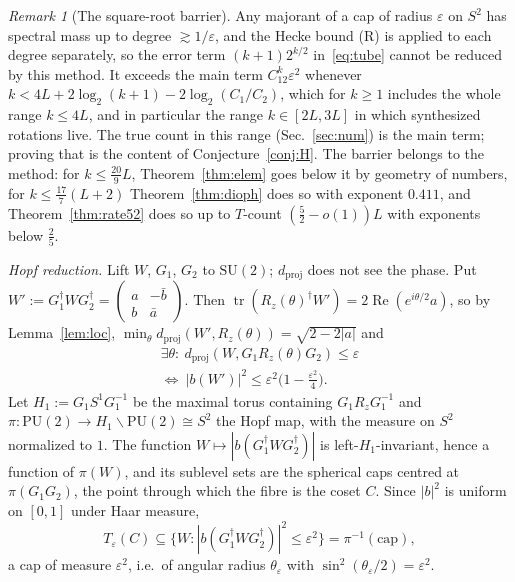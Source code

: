 \documentclass[aps,prx,twocolumn,superscriptaddress,nofootinbib,longbibliography]{revtex4-2}
\theoremstyle{plain}
\theoremstyle{definition}
\theoremstyle{remark}
\newtheorem{remark}{Remark}
\newcommand{\dproj}{d_{\mathrm{proj}}}
\newcommand{\PU}{\mathrm{PU}(2)}
\newcommand{\SU}{\mathrm{SU}(2)}
\newcommand{\tr}{\operatorname{tr}}
\begin{document}
\begin{remark}[The square-root barrier]\label{rem:barrier}
Any majorant of a cap of radius $\varepsilon$ on $S^2$ has spectral mass up to degree $\gtrsim1/\varepsilon$, and the Hecke bound (R) is applied to each degree separately, so the error term $(k+1)2^{k/2}$ in~\eqref{eq:tube} cannot be reduced by this method. It exceeds the main term $C_12^k\varepsilon^2$ whenever $k<4L+2\log_2(k+1)-2\log_2(C_1/C_2)$, which for $k\ge1$ includes the whole range $k\le4L$, and in particular the range $k\in[2L,3L]$ in which synthesized rotations live. The true count in this range (Sec.~\ref{sec:num}) is the main term; proving that is the content of Conjecture~\ref{conj:H}. The barrier belongs to the method: for $k\le\tfrac{20}9L$, Theorem~\ref{thm:elem} goes below it by geometry of numbers, for $k\le\tfrac{17}7(L+2)$ Theorem~\ref{thm:dioph} does so with exponent $0.411$, and Theorem~\ref{thm:rate52} does so up to $T$-count $(\tfrac52-o(1))L$ with exponents below $\tfrac25$.
\end{remark}

\emph{Hopf reduction.} Lift $W$, $G_1$, $G_2$ to $\SU$; $\dproj$ does not see the phase. Put $W':=G_1^\dagger WG_2^\dagger=\begin{pmatrix}a&-\bar b\\ b&\bar a\end{pmatrix}$. Then $\tr(R_z(\theta)^\dagger W')=2\operatorname{Re}(e^{i\theta/2}a)$, so by Lemma~\ref{lem:loc}, $\min_\theta\dproj(W',R_z(\theta))=\sqrt{2-2|a|}$ and
\begin{multline}\label{eq:btube}
\exists\theta:\ \dproj(W,G_1R_z(\theta)G_2)\le\varepsilon\\
\iff\ |b(W')|^2\le\varepsilon^2\big(1-\tfrac{\varepsilon^2}4\big).
\end{multline}
Let $H_1:=G_1S^1G_1^{-1}$ be the maximal torus containing $G_1R_zG_1^{-1}$ and $\pi:\PU\to H_1\backslash\PU\cong S^2$ the Hopf map, with the measure on $S^2$ normalized to $1$. The function $W\mapsto|b(G_1^\dagger WG_2^\dagger)|$ is left-$H_1$-invariant, hence a function of $\pi(W)$, and its sublevel sets are the spherical caps centred at $\pi(G_1G_2)$, the point through which the fibre is the coset $C$. Since $|b|^2$ is uniform on $[0,1]$ under Haar measure,
\begin{equation}
T_\varepsilon(C)\subseteq\{W:|b(G_1^\dagger WG_2^\dagger)|^2\le\varepsilon^2\}=\pi^{-1}(\mathrm{cap}),
\end{equation}
a cap of measure $\varepsilon^2$, i.e.\ of angular radius $\theta_\varepsilon$ with $\sin^2(\theta_\varepsilon/2)=\varepsilon^2$.
\end{document}
